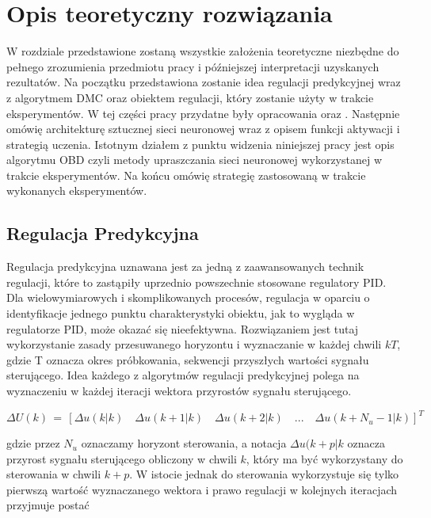 \newpage %
\section{Opis teoretyczny rozwiązania}
\par W rozdziale przedstawione zostaną wszystkie założenia teoretyczne niezbędne do pełnego zrozumienia przedmiotu pracy i późniejszej interpretacji uzyskanych rezultatów. Na początku przedstawiona zostanie idea regulacji predykcyjnej wraz z algorytmem DMC oraz obiektem regulacji, który zostanie użyty w trakcie eksperymentów. W tej części pracy przydatne były opracowania \cite{stp2009} oraz  .  Następnie omówię architekturę sztucznej sieci neuronowej wraz z opisem funkcji aktywacji i strategią uczenia. Istotnym działem z punktu widzenia niniejszej pracy jest opis algorytmu OBD czyli metody upraszczania sieci neuronowej wykorzystanej w trakcie eksperymentów. Na końcu omówię strategię zastosowaną w trakcie wykonanych eksperymentów.

\subsection{Regulacja Predykcyjna}
\par Regulacja predykcyjna uznawana jest za jedną z zaawansowanych technik regulacji, które to zastąpiły uprzednio powszechnie stosowane regulatory PID. Dla wielowymiarowych i skomplikowanych procesów, regulacja w oparciu o identyfikacje jednego punktu charakterystyki obiektu, jak to wygląda w regulatorze PID, może okazać się nieefektywna. Rozwiązaniem jest tutaj wykorzystanie zasady przesuwanego horyzontu i wyznaczanie w każdej chwili \(kT\), gdzie T oznacza okres próbkowania, sekwencji przyszłych wartości sygnału sterującego. Idea każdego z algorytmów regulacji predykcyjnej polega na wyznaczeniu w każdej iteracji wektora przyrostów sygnału sterującego.
 
\begin{equation}
\Delta U(k) \, = \, [\Delta u(k|k)\quad \Delta u(k+1|k)\quad \Delta u(k+2|k)\quad ... \quad \Delta u(k + N_u - 1|k)]^T
\end{equation}

gdzie przez \(N_u\) oznaczamy horyzont sterowania, a notacja \(\Delta u(k+p|k\) oznacza przyrost sygnału sterującego obliczony w chwili \(k\), który ma być wykorzystany do sterowania w chwili \(k+p\). W istocie jednak do sterowania wykorzystuje się tylko pierwszą wartość wyznaczanego wektora i prawo regulacji w kolejnych iteracjach przyjmuje postać

